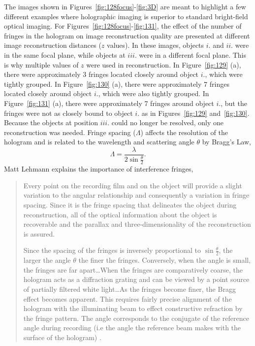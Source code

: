 The images shown in Figures~\ref{fig:128focus}-\ref{fig:3D} are meant to highlight a few different
examples where holographic imaging is superior to standard bright-field optical
imaging.
For Figures~\ref{fig:128focus}-\ref{fig:131}, the effect of the number of fringes in the hologram
on image reconstruction quality are presented at different image reconstruction
distances ($z$ values).
In these images,
objects $i.$ and $ii.$ were in the same focal plane, while objects at $iii.$
were in
a different focal plane. This is why multiple values of $z$ were used in
reconstruction. In Figure~\ref{fig:129} (a), there were approximately 3 fringes
located closely around object $i.$, which were tightly grouped. In
Figure~\ref{fig:130} (a), there were approximately 7 fringes
located closely around object $i.$, which were also tightly grouped. In
Figure~\ref{fig:131} (a), there were approximately 7 fringes around object
$i.$, but the fringes were not as closely bound to object $i.$ as in
Figures~\ref{fig:129} and~\ref{fig:130}. 
Because the objects at position $iii.$ could no longer be resolved, only one
reconstruction was needed.
Fringe spacing ($\Lambda$) affects the resolution of the
hologram and is related to the wavelength and scattering angle $\theta$
by Bragg's Law,
\begin{equation}
    \Lambda = \frac{\lambda}{2\sin{\frac{\theta}{2}}} .
\end{equation}
Matt Lehmann explains the importance of interference fringes,
\begin{quote}
Every point on the recording film and on the object will provide a
slight variation to the angular relationship and consequently a variation
in fringe spacing. Since it is the fringe spacing that delineates
the object
during reconstruction, all of the optical information about the object is
recoverable and the parallax and three-dimensionality of the
reconstruction is assured.

Since the spacing of the fringes is inversely proportional to
$\sin{\frac{\theta}{2}}$, the larger the angle $\theta$ the finer the fringes.
Conversely, when the angle is small, the fringes are far apart\ldots When the
fringes are comparatively coarse, the hologram acts as a diffraction grating
and can be viewed by a point source of partially filtered white light\ldots As
the fringes become finer, the Bragg effect becomes apparent. This requires
fairly precise alignment of the hologram with the illuminating beam to effect
constructive refraction by the fringe pattern. The angle corresponds to the
conjugate of the reference angle during recording (i.e the angle the reference
beam makes with the surface of the hologram) \cite{Lehmann}.
\end{quote}
